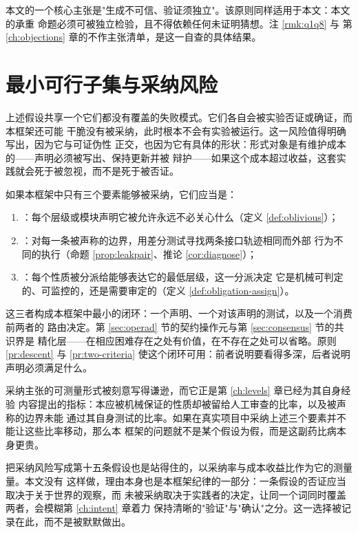 \begin{remark}[纲领的自我检验]
本文的一个核心主张是"生成不可信、验证须独立"。该原则同样适用于本文：本文的承重
命题必须可被独立检验，且不得依赖任何未证明猜想。注 \ref{rmk:q1q8} 与
第 \ref{ch:objections} 章的不作主张清单，是这一自查的具体结果。
\end{remark}

\section{最小可行子集与采纳风险}\label{sec:mvs}

上述假设共享一个它们都没有覆盖的失败模式。它们各自会被实验否证或确证，而本框架还可能
干脆没有被采纳，此时根本不会有实验被运行。这一风险值得明确写出，因为它与可证伪性
正交，也因为它有具体的形状：形式对象是有维护成本的——声明必须被写出、保持更新并被
辩护——如果这个成本超过收益，这套实践就会死于被忽视，而不是死于被否证。

\begin{principle}[最小可行子集]\label{pr:mvs}
如果本框架中只有三个要素能够被采纳，它们应当是：
\begin{enumerate}[label=(\alph*)]
\item {}：每个层级或模块声明它被允许永远不必关心什么（定义
      \ref{def:oblivious}）；
\item {}：对每一条被声称的边界，用差分测试寻找两条接口轨迹相同而外部
      行为不同的执行（命题 \ref{prop:leakpair}、推论 \ref{cor:diagnose}）；
\item {}：每个性质被分派给能够表达它的最低层级，这一分派决定
      它是机械可判定的、可监控的，还是需要审定的（定义 \ref{def:obligation-assign}）。
\end{enumerate}
这三者构成本框架中最小的闭环：一个声明、一个对该声明的测试，以及一个消费前两者的
路由决定。第 \ref{sec:operad} 节的契约操作元与第 \ref{sec:consensus} 节的共识界是
精化层——在相应困难存在之处有价值，在不存在之处可以省略。原则 \ref{pr:descent} 与
\ref{pr:two-criteria} 使这个闭环可用：前者说明要看得多深，后者说明声明必须满足什么。
\end{principle}

采纳主张的可测量形式被刻意写得谦逊，而它正是第 \ref{ch:levels} 章已经为其自身经验
内容提出的指标：本应被机械保证的性质却被留给人工审查的比率，以及被声称的边界未能
通过其自身测试的比率。如果在真实项目中采纳上述三个要素并不能让这些比率移动，那么本
框架的问题就不是某个假设为假，而是这副药比病本身更贵。

把采纳风险写成第十五条假设也是站得住的，以采纳率与成本收益比作为它的测量量。本文没有
这样做，理由本身也是本框架纪律的一部分：一条假设的否证应当取决于关于世界的观察，而
未被采纳取决于实践者的决定，让同一个词同时覆盖两者，会模糊第 \ref{ch:intent} 章着力
保持清晰的"验证"与"确认"之分。这一选择被记录在此，而不是被默默做出。
